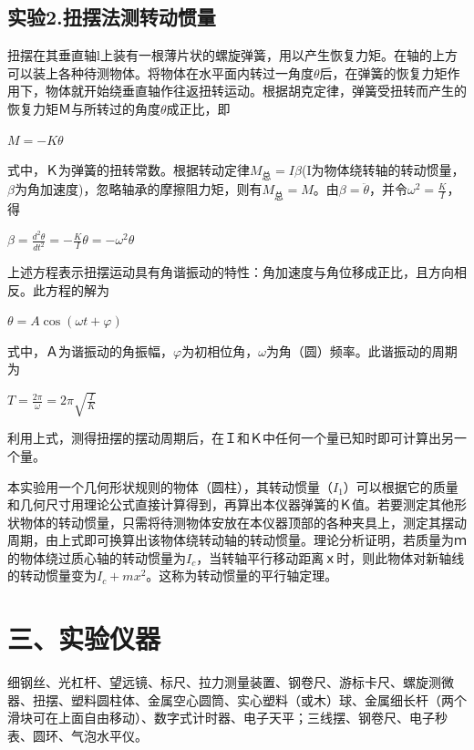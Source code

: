 \documentclass[11pt,a4paper,oneside]{article}
\begin{document}
\subsection*{实验2.扭摆法测转动惯量}
扭摆在其垂直轴l上装有一根薄片状的螺旋弹簧，用以产生恢复力矩。在轴的上方可以装上各种待测物体。将物体在水平面内转过一角度$\theta$后，在弹簧的恢复力矩作用下，物体就开始绕垂直轴作往返扭转运动。根据胡克定律，弹簧受扭转而产生的恢复力矩Ｍ与所转过的角度$\theta$成正比，即
\begin{center}
$M=-K\theta$
\end{center}
式中，Ｋ为弹簧的扭转常数。根据转动定律$M_{\text{总}}=I{\beta}$(I为物体绕转轴的转动惯量，$\beta$为角加速度)，忽略轴承的摩擦阻力矩，则有$M_{\text{总}}=M$。由$\beta = \ddot{\theta}$，并令$\omega ^2=\displaystyle\frac{K}{I}$，得
\begin{center}
$\beta =\displaystyle\frac{d^2\theta}{dt^2}=-\displaystyle\frac{K}{I}\theta=-\omega ^2\theta $
\end{center}
上述方程表示扭摆运动具有角谐振动的特性：角加速度与角位移成正比，且方向相反。此方程的解为
\begin{center}
$\theta =A\cos (\omega t+\varphi )$
\end{center}
式中，Ａ为谐振动的角振幅，$\varphi$为初相位角，$\omega$为角（圆）频率。此谐振动的周期为
\begin{center}
$ T=\displaystyle\frac{2\pi }{\omega}=2\pi \sqrt{\displaystyle\frac{I}{K}}$
\end{center}
利用上式，测得扭摆的摆动周期后，在Ｉ和Ｋ中任何一个量已知时即可计算出另一个量。

本实验用一个几何形状规则的物体（圆柱），其转动惯量（$I_1$）可以根据它的质量和几何尺寸用理论公式直接计算得到，再算出本仪器弹簧的$Ｋ$值。若要测定其他形状物体的转动惯量，只需将待测物体安放在本仪器顶部的各种夹具上，测定其摆动周期，由上式即可换算出该物体绕转动轴的转动惯量。理论分析证明，若质量为$ｍ$的物体绕过质心轴的转动惯量为$I_c$，当转轴平行移动距离ｘ时，则此物体对新轴线的转动惯量变为$I_c+mx^2$。这称为转动惯量的平行轴定理。




\section*{三、实验仪器}
细钢丝、光杠杆、望远镜、标尺、拉力测量装置、钢卷尺、游标卡尺、螺旋测微器、扭摆、塑料圆柱体、金属空心圆筒、实心塑料（或木）球、金属细长杆（两个滑块可在上面自由移动）、数字式计时器、电子天平；三线摆、钢卷尺、电子秒表、圆环、气泡水平仪。
\end{document}

